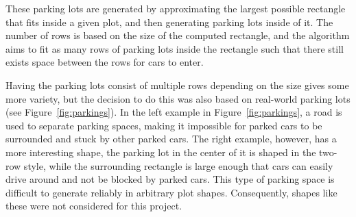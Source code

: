 These parking lots are generated by approximating the largest possible rectangle that fits inside a given plot, and then generating parking lots inside of it.
The number of rows is based on the size of the computed rectangle, and the algorithm aims to fit as many rows of parking lots inside the rectangle such that there still exists space between the rows for cars to enter.

Having the parking lots consist of multiple rows depending on the size gives some more variety, but the decision to do this was also based on real-world parking lots (see Figure~\ref{fig:parkings}).
In the left example in Figure~\ref{fig:parkings}, a road is used to separate parking spaces, making it impossible for parked cars to be surrounded and stuck by other parked cars.
The right example, however, has a more interesting shape, the parking lot in the center of it is shaped in the two-row style, while the surrounding rectangle is large enough that cars can easily drive around and not be blocked by parked cars.
This type of parking space is difficult to generate reliably in arbitrary plot shapes.
Consequently, shapes like these were not considered for this project.

